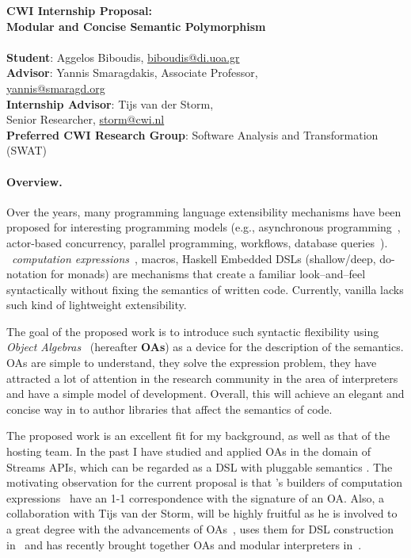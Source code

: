 \documentclass{sigplanconf}
\begin{document}
\noindent
\textbf{CWI Internship Proposal: \\
Modular and Concise Semantic Polymorphism}
\\
\mbox{}\\
\textbf{Student}: Aggelos Biboudis, \url{biboudis@di.uoa.gr} \\
\textbf{Advisor}: Yannis Smaragdakis, Associate Professor, \\\url{yannis@smaragd.org}\\
\textbf{Internship Advisor}: Tijs van der Storm, \\Senior Researcher, \url{storm@cwi.nl}\\
\textbf{Preferred CWI Research Group}: Software Analysis and
Transformation (SWAT)\\

\paragraph{Overview.}

Over the years, many programming language extensibility mechanisms have
been proposed for interesting programming models (e.g., asynchronous
programming~\cite{bierman_pause_2012}, actor-based concurrency,
parallel programming, workflows, database
queries~\cite{meijer_linq:_2006}). %
\fs{}~\emph{computation expressions}~\cite{petricek_f_2014}, macros,
Haskell Embedded DSLs (shallow/deep, do-notation for monads) are
mechanisms that create a familiar look--and--feel syntactically
without fixing the semantics of written code. Currently, vanilla
\java{} lacks such kind of lightweight extensibility.

The goal of the proposed work is to introduce such syntactic
flexibility using \emph{Object
  Algebras}~\cite{oliveira_extensibility_2012} (hereafter
\textbf{OAs}) as a device for the description of the semantics. OAs
are simple to understand, they solve the expression problem, they have
attracted a lot of attention in the research community in the area of
interpreters and have a simple model of development. Overall, this
will achieve an elegant and concise way in \java{} to author libraries
that affect the semantics of code.

The proposed work is an excellent fit for my background, as well as
that of the hosting team. In the past I have studied and applied OAs
in the domain of Streams APIs, which can be regarded as a DSL with
pluggable semantics \cite{biboudis_streams_2015}. The motivating
observation for the current proposal is that \fs{}'s builders of
computation expressions~\cite[Chapter~6.3.10]{syme_f_2012} have an 1-1
correspondence with the signature of an OA. Also, a collaboration with
Tijs van der Storm, will be highly fruitful as he is involved to a
great degree with the advancements of
OAs~\cite{oliveira_feature-oriented_2013}, uses them for DSL
construction in~\cite{gouseti_extensible_2014} and has recently
brought together OAs and modular interpreters
in~\cite{inostroza_modular_2015}.
\end{document}
